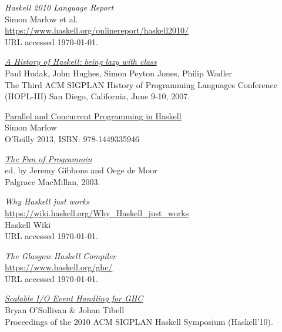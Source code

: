 \documentclass[a4paper,11pt,oneside]{report}
\begin{document}
\begin{thebibliography}{9}

  \emph{Haskell 2010 Language Report}\\
  \newblock Simon Marlow et al.\\
  \newblock \url{https://www.haskell.org/onlinereport/haskell2010/}\\
  \newblock URL accessed \today.

  \href{http://research.microsoft.com/en-us/um/people/simonpj/papers/history-of-haskell/history.pdf}{\emph{A History of Haskell: being lazy with class}}\\
  \newblock Paul Hudak, John Hughes, Simon Peyton Jones, Philip Wadler\\
  \newblock The Third ACM SIGPLAN History of Programming Languages Conference
  (HOPL-III) San Diego, California, June 9-10, 2007.

  \href{http://community.haskell.org/~simonmar/pcph/}{Parallel and Concurrent
    Programming in Haskell}\\
  \newblock Simon Marlow\\
  \newblock O'Reilly 2013, ISBN: 978-1449335946

  \href{https://www.cs.ox.ac.uk/publications/books/fop/}{\emph{The Fun of Programmin}}\\
  \newblock ed. by Jeremy Gibbons and Oege de Moor\\
  \newblock Palgrace MacMillan, 2003.

 \emph{Why Haskell just works}\\
  \newblock \url{https://wiki.haskell.org/Why_Haskell_just_works}\\
  \newblock Haskell Wiki\\
  \newblock URL accessed \today.

  \emph{The Glasgow Haskell Compiler}\\
  \newblock \url{https://www.haskell.org/ghc/}\\
  \newblock URL accessed \today.

  \href{http://research.google.com/pubs/pub36841.html}{\emph{Scalable I/O Event Handling for GHC}}\\
  \newblock Bryan O'Sullivan \& Johan Tibell\\
  \newblock Proceedings of the 2010 ACM SIGPLAN Haskell Symposium (Haskell'10).


\end{thebibliography}
\end{document}
